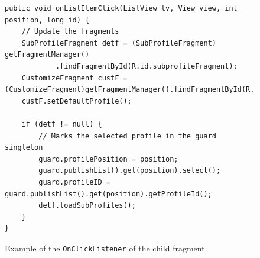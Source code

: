 \begin{figure}[H]%
		\begin{lstlisting}
public void onListItemClick(ListView lv, View view, int position, long id) {
	// Update the fragments
	SubProfileFragment detf = (SubProfileFragment) getFragmentManager()
			.findFragmentById(R.id.subprofileFragment);
	CustomizeFragment custF = (CustomizeFragment)getFragmentManager().findFragmentById(R.id.customizeFragment);
	custF.setDefaultProfile();
	
	if (detf != null) {
		// Marks the selected profile in the guard singleton
		guard.profilePosition = position; 
		guard.publishList().get(position).select();
		guard.profileID = guard.publishList().get(position).getProfileId();
		detf.loadSubProfiles();
	}
}
		\end{lstlisting}
	\caption{Example of the \texttt{OnClickListener} of the child fragment.}
	\label{code:listview_onclick_example}%
\end{figure}


